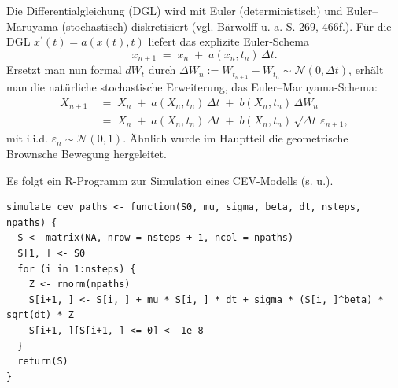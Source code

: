 Die Differentialgleichung (DGL) wird mit Euler (deterministisch) und Euler–Maruyama (stochastisch) diskretisiert (vgl. Bärwolff \cite{Baerwolff2025} u. a. S. 269, 466f.).
Für die DGL $x^\prime(t)=a(x(t),t)$ liefert das explizite Euler‑Schema
$$
x_{n+1} \;=\; x_n \;+\; a(x_n,t_n)\,\Delta t.
$$
Ersetzt man nun formal $dW_t$ durch $\Delta W_n:=W_{t_{n+1}}-W_{t_n}\sim \mathcal N(0,\Delta t)$, erhält man die natürliche stochastische Erweiterung, das Euler–Maruyama‑Schema:
$$
\begin{aligned}
X_{n+1} \;&=\; X_n \;+\; a(X_n,t_n)\,\Delta t \;+\; b(X_n,t_n)\,\Delta W_n \\
\;&=\; X_n \;+\; a(X_n,t_n)\,\Delta t \;+\; b(X_n,t_n)\,\sqrt{\Delta t}\,\varepsilon_{n+1},
\end{aligned}
$$
mit i.i.d. $\varepsilon_{n}\sim\mathcal N(0,1)$. 
Ähnlich wurde im Hauptteil die geometrische Brownsche Bewegung hergeleitet.

\begin{bsp}[Implementierung]
Es folgt ein R-Programm zur Simulation eines CEV-Modells (s. u.).

\begin{lstlisting}
simulate_cev_paths <- function(S0, mu, sigma, beta, dt, nsteps, npaths) {
  S <- matrix(NA, nrow = nsteps + 1, ncol = npaths)
  S[1, ] <- S0
  for (i in 1:nsteps) {
    Z <- rnorm(npaths)
    S[i+1, ] <- S[i, ] + mu * S[i, ] * dt + sigma * (S[i, ]^beta) * sqrt(dt) * Z
    S[i+1, ][S[i+1, ] <= 0] <- 1e-8
  }
  return(S)
}
\end{lstlisting}

\end{bsp}

